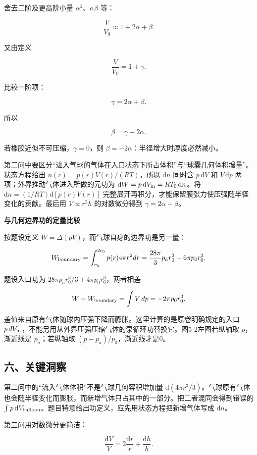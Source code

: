 \documentclass[12pt,a4paper,UTF8]{ctexart}
\begin{document}
舍去二阶及更高阶小量 \(\alpha^2\)、\(\alpha\beta\) 等：

\[\frac{V}{V_0}\approx1+2\alpha+\beta.\]

又由定义

\[\frac{V}{V_0}=1+\gamma.\]

比较一阶项：

\[\gamma=2\alpha+\beta.\]

所以

\[\boxed{\beta=\gamma-2\alpha}.\]

若橡胶近似不可压缩，\(\gamma=0\)，则
\(\beta=-2\alpha\)：半径增大时厚度必然减小。

第二问中要区分``进入气球的气体在入口状态下所占体积''与``球囊几何体积增量''。状态方程给出
\(n(r)=p(r)V(r)/(RT)\)，所以 \(\mathrm{d}n\) 同时含 \(p\,\mathrm{d}V\)
和 \(V\,\mathrm{d}p\) 两项；外界推动气体进入所做的元功为
\(\mathrm{d}W=p\,\mathrm{d}V_{\rm in}=RT_0\,\mathrm{d}n\)。将
\(\mathrm{d}n=(1/RT)\mathrm{d}[p(r)V(r)]\)
完整展开再积分，才能保留膜张力使压强随半径变化的贡献。最后用
\(V\propto r^2h\) 的对数微分得到 \(\gamma=2\alpha+\beta\)。

\textbf{与几何边界功的定量比较}

按题设定义 \(W=\Delta(pV)\)，而气球自身的边界功是另一量：

\[W_{\rm boundary}=\int_{r_0}^{2r_0}p(r)4\pi r^2dr
=\frac{28\pi}{3}p_ar_0^3+6\pi p_0r_0^3.\]

题设入口功为 \(28\pi p_ar_0^3/3+4\pi p_0r_0^3\)，两者相差

\[W-W_{\rm boundary}=\int V\,dp=-2\pi p_0r_0^3.\]

差值来自原有气体随球内压强下降而膨胀。这里计算的是原卷明确规定的入口
\(p\,dV_{\rm in}\)，不能另用从外界压强压缩气体的泵循环功替换它。图5-2左图若纵轴取
\(p\)，渐近线是 \(p_a\)；若纵轴取 \((p-p_a)/p_0\)，渐近线才是0。

\subsection{六、关键洞察}\label{ux516dux5173ux952eux6d1eux5bdf-4}

第二问中的``流入气体体积''不是气球几何容积增加量
\(\mathrm{d}(4\pi r^3/3)\)。气球原有气体也会随半径变化而膨胀，而新增气体只占其中的一部分。把二者混同会得到错误的
\(\int p\,\mathrm{d}V_{\rm balloon}\)。题目特意给出功定义，应先用状态方程把新增气体写成
\(\mathrm{d}n\)。

第三问用对数微分更简洁：

\[\frac{\mathrm{d}V}{V}=2\frac{\mathrm{d}r}{r}+\frac{\mathrm{d}h}{h}.\]
\end{document}
